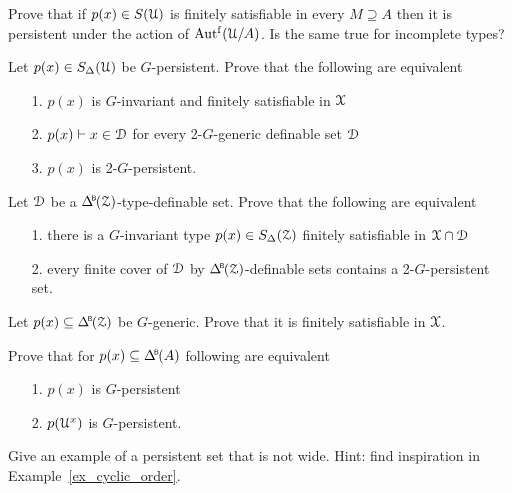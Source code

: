 \begin{exercise}
  Prove that if $p(x)\in S(\EuScript U)$ is finitely satisfiable in every $M\supseteq A$ then it is persistent under the action of $\mbox{Aut$^{\rm f}$}(\EuScript U/A)$.
  Is the same true for incomplete types?
\end{exercise}

\begin{exercise}
  Let $p(x)\in S_\Delta(\EuScript U)$ be $G$-persistent.
  Prove that the following are equivalent
  \begin{itemize}
    \item[1.] $p(x)$ is $G$-invariant and finitely satisfiable in $\EuScript X$
    \item[2.] $p(x)\vdash x\in\EuScript D$ for every 2-$G$-generic definable set $\EuScript D$
    \item[3.] $p(x)$ is 2-$G$-persistent.
  \end{itemize}
\end{exercise}

\begin{exercise}
  Let $\EuScript D$ be a $\BDelta({\Z})$-type-definable set.
  Prove that the following are equivalent 
  \begin{itemize}
    \item[1.] there is a $G$-invariant type $p(x)\in S_\Delta(\EuScript Z)$ finitely satisfiable in $\EuScript X\cap\EuScript D$
    \item[2.] every finite cover of $\EuScript D$ by $\BDelta({\Z})$-definable sets contains a 2-$G$-persistent set.
  \end{itemize}
\end{exercise}

\begin{exercise}\label{ex_gen_sat}
  Let $p(x)\subseteq \BDelta(\Z)$ be $G$-generic.
  Prove that it is finitely satisfiable in $\EuScript X$.
\end{exercise}

\begin{exercise}\label{ex_persistent_types}
  Prove that for $p(x)\subseteq \BDelta(A)$ following are equivalent
  \begin{itemize}
    \item[1.] $p(x)$ is $G$-persistent
    \item[2.] $p(\EuScript U^x)$ is $G$-persistent.
  \end{itemize}
\end{exercise}

\begin{exercise}
  Give an example of a persistent set that is not wide.
  Hint: find inspiration in Example~\ref{ex_cyclic_order}.
\end{exercise}

